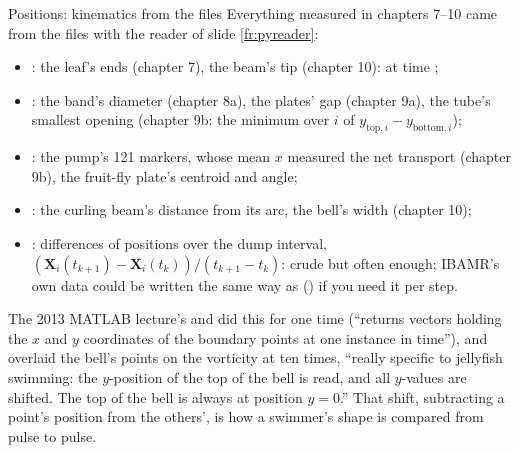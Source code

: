 \documentclass[aspectratio=169,11pt]{beamer}
\begin{document}
\begin{frame}{Positions: kinematics from the  files}
\label{fr:positions}
\small Everything measured in chapters 7--10 came from the  files with the reader of slide \ref{fr:pyreader}:
\begin{itemize}
  \item {}: the leaf's ends (chapter 7), the beam's tip (chapter 10):  at time ;
  \item {}: the band's diameter (chapter 8a), the plates' gap (chapter 9a), the tube's smallest opening (chapter 9b: the minimum over $i$ of $y_{\mathrm{top},i} - y_{\mathrm{bottom},i}$);
  \item {}: the pump's 121 markers, whose mean $x$ measured the net transport (chapter 9b), the fruit-fly plate's centroid and angle;
  \item {}: the curling beam's distance from its arc, the bell's width (chapter 10);
  \item {}: differences of positions over the dump interval, $(\mathbf{X}_i(t_{k+1}) - \mathbf{X}_i(t_k))/(t_{k+1} - t_k)$: crude but often enough; IBAMR's own  data could be written the same way as  () if you need it per step.
\end{itemize}
\vspace{1mm}
\footnotesize The 2013 MATLAB lecture's  and  did this for one time (``returns vectors holding the $x$ and $y$ coordinates of the boundary points at one instance in time''), and  overlaid the bell's points on the vorticity at ten times, ``really specific to jellyfish swimming: the $y$-position of the top of the bell is read, and all $y$-values are shifted. The top of the bell is always at position $y = 0$.'' That shift, subtracting a point's position from the others', is how a swimmer's shape is compared from pulse to pulse.
\end{frame}
\end{document}
